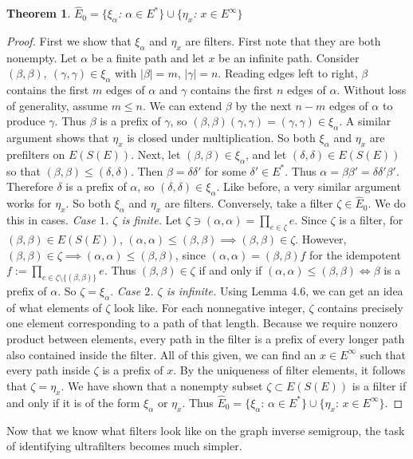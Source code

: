 \documentclass[12pt]{article}
\newtheorem{theorem}{Theorem}[section]
\theoremstyle{definition}
\begin{document}
\begin{theorem} $\hat{E}_0 = \{\xi_\alpha$: $\alpha \in E^*\} \cup \{\eta_x$: $x \in E^\infty\}$ \end{theorem}
\begin{proof}
    First we show that $\xi_\alpha$ and $\eta_x$ are filters. First note that they are both nonempty. Let $\alpha$ be a finite path and let $x$ be an infinite path.
    Consider $(\beta, \beta), \ (\gamma, \gamma) \in \xi_\alpha$ with $|\beta| = m$, $|\gamma| = n$. 
    Reading edges left to right, $\beta$ contains the first $m$ edges of $\alpha$ and $\gamma$ 
    contains the first $n$ edges of $\alpha$. Without loss of generality, assume $m \leq n$. 
    We can extend $\beta$ by the next $n - m$ edges of $\alpha$ to produce $\gamma$. Thus
    $\beta$ is a prefix of $\gamma$, so $(\beta, \beta)(\gamma, \gamma) = (\gamma, \gamma) \in \xi_\alpha$.
    A similar argument shows that $\eta_x$ is closed under multiplication. So both $\xi_\alpha$ and $\eta_x$ are prefilters
    on $E(S(E))$. Next, let $(\beta, \beta) \in \xi_\alpha$, and let $(\delta, \delta) \in E(S(E))$ so that 
    $(\beta, \beta) \leq (\delta, \delta)$. Then $\beta = \delta \delta'$ for some $\delta' \in E^*$. 
    Thus $\alpha = \beta \beta' = \delta \delta' \beta'$. Therefore $\delta$ is a prefix of $\alpha$, so 
    $(\delta, \delta) \in \xi_\alpha$. Like before, a very similar argument works for $\eta_x$. So both 
    $\xi_\alpha$ and $\eta_x$ are filters.
    \newline
    Conversely, take a filter $\zeta \in \hat{E}_0$. We do this in cases. \emph{Case $1$. $\zeta$ is finite.}
    Let $\zeta \ni (\alpha, \alpha) = \prod_{e \in \zeta} e$. Since $\zeta$ is a filter,
    for $(\beta, \beta) \in E(S(E))$, $(\alpha, \alpha) \leq (\beta, \beta) \implies (\beta, \beta) \in \zeta$.
    However, $(\beta, \beta) \in \zeta \implies (\alpha, \alpha) \leq (\beta, \beta)$, since $(\alpha, \alpha) = (\beta, \beta)f$ 
    for the idempotent $f := \prod_{e \in \zeta \setminus \{(\beta, \beta)\}} e$.
    Thus $(\beta, \beta) \in \zeta$ if and only if $(\alpha, \alpha) \leq (\beta, \beta) \iff \beta$ is a prefix of $\alpha$. So $\zeta = \xi_\alpha$.
    \newline
    \emph{Case $2$. $\zeta$ is infinite.}
    Using Lemma 4.6, we can get an idea of what elements of $\zeta$ look like.
    For each nonnegative integer, $\zeta$ contains precisely one element corresponding
    to a path of that length. Because we require nonzero product between elements, every
    path in the filter is a prefix of every longer path also contained inside the filter.
    All of this given, we can find an $x \in E^\infty$ such that every path inside $\zeta$
    is a prefix of $x$. By the uniqueness of filter elements, it follows that $\zeta = \eta_x$.
    \newline
    We have shown that a nonempty subset $\zeta \subset E(S(E))$ is a filter if and only if
    it is of the form $\xi_\alpha$ or $\eta_x$. Thus $\hat{E}_0 = \{\xi_\alpha$: $\alpha \in E^*\} \cup \{\eta_x$: $x \in E^\infty\}$.
\end{proof}
Now that we know what filters look like on the graph inverse semigroup, the task of identifying ultrafilters becomes much simpler.
\end{document}

